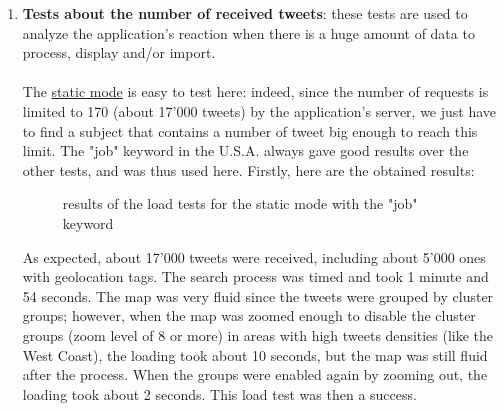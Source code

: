 \documentclass[a4paper,11pt]{report}
\begin{document}
\begin{enumerate}
	\item \textbf{Tests about the number of received tweets}: these tests are used to analyze the application's reaction when there is a huge amount of data to process, display and/or import.\\\\
	The \underline{static mode} is easy to test here: indeed, since the number of requests is limited to 170 (about 17'000 tweets) by the application's server, we just have to find a subject that contains a number of tweet big enough to reach this limit. The "job" keyword in the U.S.A. always gave good results over the other tests, and was thus used here. Firstly, here are the obtained results:
	\begin{figure}[H]
	\vspace{-5pt}
	\begin{center}
	\vspace{-5pt}
	\caption{results of the load tests for the static mode with the "job" keyword}
	\end{center}
	\end{figure}
	\vspace{-10pt}
	
	As expected, about 17'000 tweets were received, including about 5'000 ones with geolocation tags. The search process was timed and took 1 minute and 54 seconds. The map was very fluid since the tweets were grouped by cluster groups; however, when the map was zoomed enough to disable the cluster groups (zoom level of 8 or more) in areas with high tweets densities (like the West Coast), the loading took about 10 seconds, but the map was still fluid after the process. When the groups were enabled again by zooming out, the loading took about 2 seconds. This load test was then a success.\\	
	

\end{enumerate}
\end{document}
